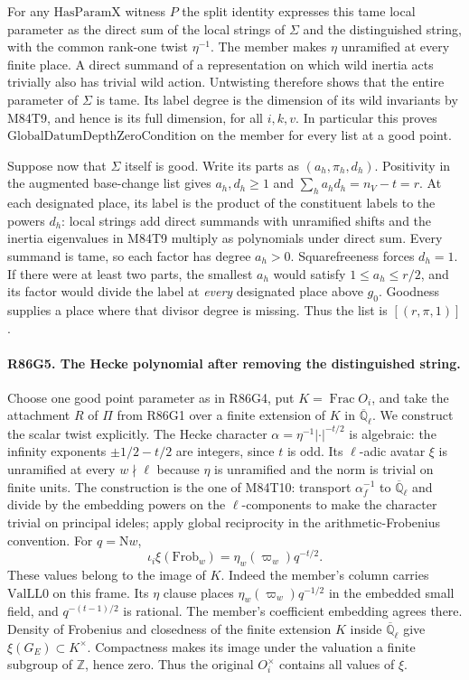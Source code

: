 For any $\mathrm{HasParamX}$ witness $P$ the split identity expresses
this tame local parameter as the direct sum of the local strings of
$\Sigma$ and the distinguished string, with the common rank-one
twist $\eta^{-1}$. The member makes $\eta$ unramified at every
finite place. A direct summand of a representation on which wild
inertia acts trivially also has trivial wild action. Untwisting
therefore shows that the entire parameter of $\Sigma$ is tame.
Its label degree is the dimension of its wild invariants by M84T9,
and hence is its full dimension, for all $i,k,v$.
In particular this proves $\mathrm{GlobalDatumDepthZeroCondition}$
on the member for every list at a good point.

Suppose now that $\Sigma$ itself is good. Write its parts as
$(a_h,\pi_h,d_h)$. Positivity in the augmented base-change list
gives $a_h,d_h\ge1$ and $\sum_h a_hd_h=n_V-t=r$.
At each designated place, its label is the product of the
constituent labels to the powers $d_h$: local strings add direct
summands with unramified shifts and the inertia eigenvalues in
M84T9 multiply as polynomials under direct sum.
Every summand is tame, so each factor has degree $a_h>0$.
Squarefreeness forces $d_h=1$. If there were at least two
parts, the smallest $a_h$ would satisfy $1\le a_h\le r/2$,
and its factor would divide the label at \emph{every} designated
place above $g_0$. Goodness supplies a place where that divisor
degree is missing. Thus the list is $[(r,\pi,1)]$.

\paragraph{R86G5. The Hecke polynomial after removing the distinguished string.}
Choose one good point parameter as in R86G4, put
$K=\operatorname{Frac}O_i$, and take the attachment $R$ of $\Pi$
from R86G1 over a finite extension of $K$ in
$\overline{\mathbb Q}_\ell$. We construct the scalar twist explicitly.
The Hecke character $\alpha=\eta^{-1}|\cdot|^{-t/2}$ is algebraic:
the infinity exponents $\pm1/2-t/2$ are integers, since $t$ is odd.
Its $\ell$-adic avatar $\xi$ is unramified at every $w\nmid\ell$
because $\eta$ is unramified and the norm is trivial on finite
units. The construction is the one of M84T10: transport
$\alpha_f^{-1}$ to $\overline{\mathbb Q}_\ell$ and divide by the
embedding powers on the $\ell$-components to make the character
trivial on principal ideles; apply global reciprocity in the
arithmetic-Frobenius convention. For $q=\mathrm Nw$,
\[
       \iota_i\xi(\mathrm{Frob}_w)=\eta_w(\varpi_w)q^{-t/2}.
\]
These values belong to the image of $K$. Indeed the member's
column carries $\mathrm{ValLL0}$ on this frame. Its $\eta$ clause
places $\eta_w(\varpi_w)q^{-1/2}$ in the embedded small field,
and $q^{-(t-1)/2}$ is rational. The member's coefficient embedding
agrees there. Density of Frobenius and closedness of the finite
extension $K$ inside $\overline{\mathbb Q}_\ell$ give
$\xi(G_E)\subset K^\times$. Compactness makes its image under
the valuation a finite subgroup of $\mathbb Z$, hence zero.
Thus the original $O_i^\times$ contains all values of $\xi$.


